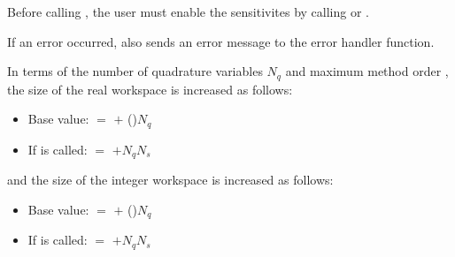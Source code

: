 {
 
 {\warn} Before calling , the user must enable the sensitivites
  by calling  or .

  If an error occurred,  also sends an error message to the
  error handler function.
}
In terms of the number of quadrature variables $N_q$ and maximum method order ,
the size of the real workspace is increased as follows:
\begin{itemize}
\item Base value:  $=$  $+$ ()$N_q$
\item If  is called:  $=$  $+ N_q N_s$ 
\end{itemize}
and the size of the integer workspace is increased as follows:
\begin{itemize}
\item Base value:  $=$  $+$ ()$N_q$
\item If  is called:  $=$  $+ N_q N_s$ 
\end{itemize}

